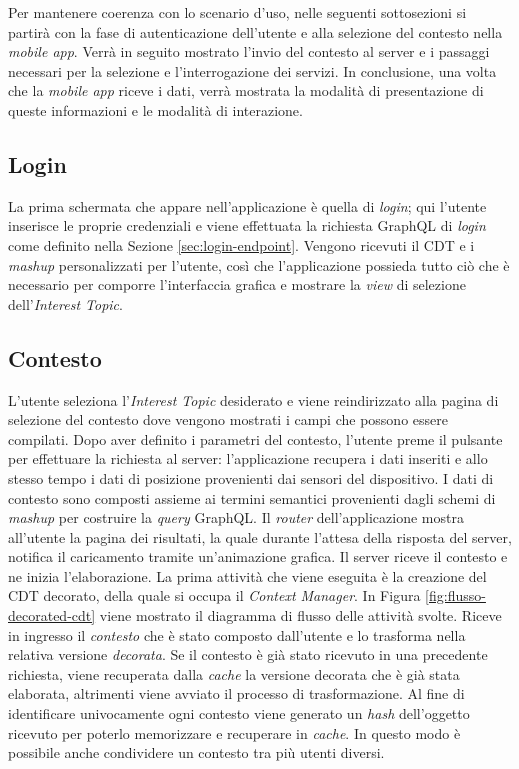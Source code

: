 Per mantenere coerenza con lo scenario d'uso, nelle seguenti sottosezioni si partirà con la fase di autenticazione dell'utente e alla selezione del contesto nella \emph{mobile app}. Verrà in seguito mostrato l'invio del contesto al server e i passaggi necessari per la selezione e l'interrogazione dei servizi. In conclusione, una volta che la \emph{mobile app} riceve i dati, verrà mostrata la modalità di presentazione di queste informazioni e le modalità di interazione.

\subsection*{Login}

La prima schermata che appare nell'applicazione è quella di \emph{login}; qui l'utente inserisce le proprie credenziali e viene effettuata la richiesta GraphQL di \emph{login} come definito nella Sezione \ref{sec:login-endpoint}.
Vengono ricevuti il CDT e i \emph{mashup} personalizzati per l'utente, così che l'applicazione possieda tutto ciò che è necessario per comporre l'interfaccia grafica e mostrare la \emph{view} di selezione dell'\emph{Interest Topic}.

\subsection*{Contesto}

L’utente seleziona l’\emph{Interest Topic} desiderato e viene reindirizzato alla pagina di selezione del contesto dove vengono mostrati i campi che possono essere compilati.
Dopo aver definito i parametri del contesto, l’utente preme il pulsante per effettuare la richiesta al server: l’applicazione recupera i dati inseriti e allo stesso tempo i dati di posizione provenienti dai sensori del dispositivo.
I dati di contesto sono composti assieme ai termini semantici provenienti dagli schemi di \emph{mashup} per costruire la \emph{query} GraphQL. Il \emph{router} dell’applicazione mostra all’utente la pagina dei risultati, la quale durante l’attesa della risposta del server, notifica il caricamento tramite un'animazione grafica. Il server riceve il contesto e ne inizia l'elaborazione.
La prima attività che viene eseguita è la creazione del CDT decorato, della quale si occupa il \emph{Context Manager}. In Figura \ref{fig:flusso-decorated-cdt} viene mostrato il diagramma di flusso delle attività svolte. Riceve in ingresso il \emph{contesto} che è stato composto dall'utente e lo trasforma nella relativa versione \emph{decorata}. Se il contesto è già stato ricevuto in una precedente richiesta, viene recuperata dalla \emph{cache} la versione decorata che è già stata elaborata, altrimenti viene avviato il processo di trasformazione. Al fine di identificare univocamente ogni contesto viene generato un \emph{hash} dell'oggetto ricevuto per poterlo memorizzare e recuperare in \emph{cache}. In questo modo è possibile anche condividere un contesto tra più utenti diversi.

